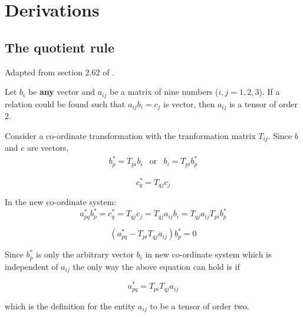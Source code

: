 \appendix

\chapter{Derivations}


\section{The quotient rule}
\label{quotientrule}

Adapted from section 2.62 of \cite{aris}.

Let $b_{i}$ be {\bf any} vector and $a_{ij}$ be a matrix of nine numbers ($i,j = 1,2,3$). If a relation could be found such that $ a_{ij} b_i = c_j $ is vector, then $a_{ij}$ is a tensor of order 2.

Consider a co-ordinate transformation with the tranformation matrix $T_{ij}$. Since $b$ and $c$ are vectors,
\begin{equation}
\begin{array}{ccc}
b_p^* = T_{pi} b_i & \mathrm{or} & b_i = T_{pi} b_p^* 
\end{array}
\end{equation}


$$ c_q^* = T_{qj} c_j $$

In the new co-ordinate system:
$$ a_{pq}^* b_p^* = c_q^* = T_{qj} c_j = T_{qj} a_{ij} b_i = T_{qj} a_{ij} T_{pi} b_p^* $$

$$ ( a_{pq}^* - T_{pi} T_{qj} a_{ij} ) b_p^* = 0 $$

Since $b_p^*$ is only the arbitrary vector $b_i$ in new co-ordinate system which is independent of $a_{ij}$ the only way the above equation can hold is if  

$$ a_{pq}^* = T_{pi} T_{qj} a_{ij}  $$

which is the definition for the entity $a_{ij}$ to be a tensor of order two.



